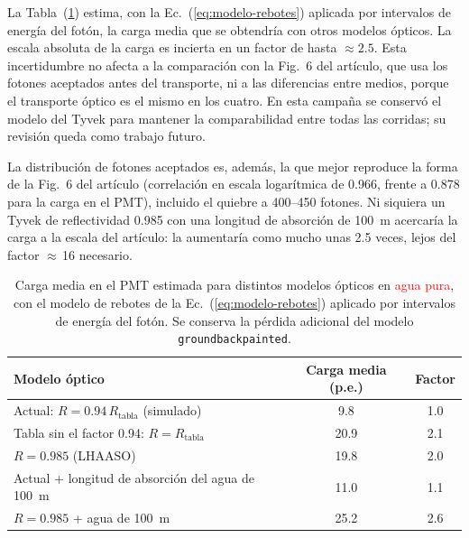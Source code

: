 La Tabla~(\ref{tab:sensibilidad-tyvek}) estima, con la Ec.~(\ref{eq:modelo-rebotes}) aplicada por intervalos de energía del fotón, la carga media que se obtendría con otros modelos ópticos. La escala absoluta de la carga es incierta en un factor de hasta $\approx2.5$. Esta incertidumbre no afecta a la comparación con la Fig.~6 del artículo, que usa los fotones aceptados antes del transporte, ni a las diferencias entre medios, porque el transporte óptico es el mismo en los cuatro. En esta campaña se conservó el modelo del Tyvek para mantener la comparabilidad entre todas las corridas; su revisión queda como trabajo futuro.

La distribución de fotones aceptados es, además, la que mejor reproduce la forma de la Fig.~6 del artículo (correlación en escala logarítmica de 0.966, frente a 0.878 para la carga en el PMT), incluido el quiebre a 400--450 fotones. Ni siquiera un Tyvek de reflectividad 0.985 con una longitud de absorción de 100~m acercaría la carga a la escala del artículo: la aumentaría como mucho unas 2.5 veces, lejos del factor $\approx$\,16 necesario.

\begin{table}[!htbp]
	\centering
	\small
	\captionsetup{width=\linewidth,justification=justified,singlelinecheck=false}
	\caption[Sensibilidad de la carga en el PMT al modelo óptico]{Carga media en el PMT estimada para distintos modelos ópticos en \textcolor{red}{agua pura}, con el modelo de rebotes de la Ec.~(\ref{eq:modelo-rebotes}) aplicado por intervalos de energía del fotón. Se conserva la pérdida adicional del modelo \texttt{groundbackpainted}.}
	\label{tab:sensibilidad-tyvek}
	\renewcommand{\arraystretch}{1.15}
	\begin{tabular}{lcc}
		\toprule
		\textbf{Modelo óptico} & \textbf{Carga media (p.e.)} & \textbf{Factor} \\
		\midrule
		Actual: $R=0.94\,R_{\mathrm{tabla}}$ (simulado) & 9.8 & 1.0 \\
		Tabla sin el factor 0.94: $R=R_{\mathrm{tabla}}$ & 20.9 & 2.1 \\
		$R=0.985$ (LHAASO) & 19.8 & 2.0 \\
		Actual + longitud de absorción del agua de 100~m & 11.0 & 1.1 \\
		$R=0.985$ + agua de 100~m & 25.2 & 2.6 \\
		\bottomrule
	\end{tabular}
\end{table}


